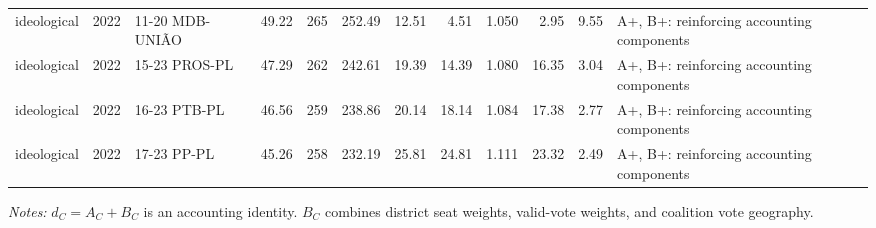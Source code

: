 \begin{landscape}
\begin{longtable}{lllrrrrrrrrL{4.0cm}}
ideological & 2022 & 11-20 MDB-UNIÃO & 49.22 & 265 & 252.49 & 12.51 & 4.51 & 1.050 & 2.95 & 9.55 & A+, B+: reinforcing accounting components \\
ideological & 2022 & 15-23 PROS-PL & 47.29 & 262 & 242.61 & 19.39 & 14.39 & 1.080 & 16.35 & 3.04 & A+, B+: reinforcing accounting components \\
ideological & 2022 & 16-23 PTB-PL & 46.56 & 259 & 238.86 & 20.14 & 18.14 & 1.084 & 17.38 & 2.77 & A+, B+: reinforcing accounting components \\
ideological & 2022 & 17-23 PP-PL & 45.26 & 258 & 232.19 & 25.81 & 24.81 & 1.111 & 23.32 & 2.49 & A+, B+: reinforcing accounting components \\
\end{longtable}
\noindent\footnotesize\textit{Notes:} \(d_C=A_C+B_C\) is an accounting identity. \(B_C\) combines district seat weights, valid-vote weights, and coalition vote geography.
\endgroup
\end{landscape}
